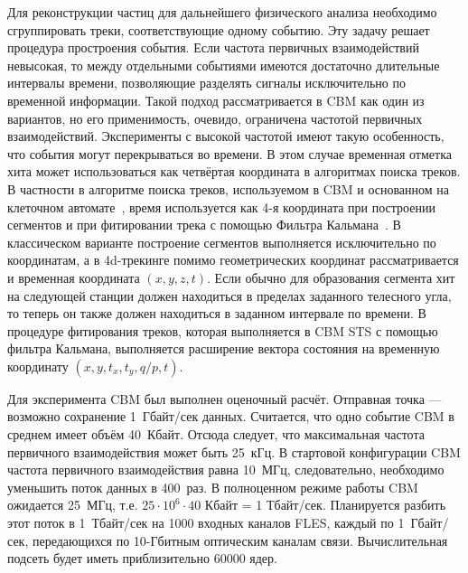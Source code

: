 Для реконструкции частиц для дальнейшего физического анализа необходимо сгруппировать треки, соответствующие одному событию. Эту задачу решает процедура простроения события.
Если частота первичных взаимодействий невысокая, то между отдельными событиями имеются достаточно длительные интервалы времени, позволяющие разделять сигналы исключительно по временной информации. Такой подход рассматривается в CBM как один из вариантов, но его применимость, очевидо, ограничена частотой первичных взаимодействий.
Эксперименты с высокой частотой имеют такую особенность, что события могут перекрываться во времени. В этом случае временная отметка хита может использоваться как четвёртая координата в алгоритмах поиска треков.
В частности в алгоритме поиска треков, используемом в CBM и основанном на клеточном автомате~\cite{AkishinaCA}, время используется как 4-я координата при построении сегментов и при фитировании трека с помощью Фильтра Кальмана~\cite{}.
В классическом варианте построение сегментов выполняется исключительно по координатам, а в 4d-трекинге помимо геометрических координат рассматривается и временная координата $(x, y, z, t)$. Если обычно для образования сегмента хит на следующей станции должен находиться в пределах заданного телесного угла, то теперь он также должен находиться в заданном интервале по времени.
В процедуре фитирования треков, которая выполняется в CBM STS с помощью фильтра Кальмана, выполняется расширение вектора состояния на временную координату $(x, y, t_{x}, t_{y}, q/p, t)$.

Для эксперимента CBM был выполнен оценочный расчёт. Отправная точка --- возможно сохранение 1~Гбайт/сек данных. Считается, что одно событие CBM в среднем имеет объём 40~Кбайт. Отсюда следует, что максимальная частота первичного взаимодействия может быть 25~кГц. В стартовой конфигурации CBM частота первичного взаимодействия равна 10~МГц, следовательно, необходимо уменьшить поток данных в 400~раз. В полноценном режиме работы CBM ожидается 25~МГц, т.е. $ 25 \cdot 10^{6} \cdot 40 $ Кбайт = 1 Тбайт/сек. Планируется разбить этот поток в 1~Тбайт/сек на 1000 входных каналов FLES, каждый по 1~Гбайт/сек, передающихся по 10-Гбитным оптическим каналам связи. Вычислительная подсеть будет иметь приблизительно 60000 ядер.

